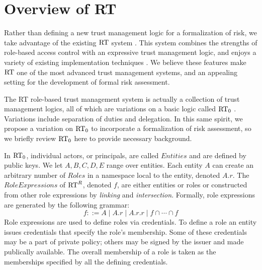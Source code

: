 \section{Overview of RT}
\label{section-rt}

Rather than defining a new trust management logic for a formalization
of risk, we take advantage of the existing $\text{RT}$ system
\cite{Li:2003-04}.  This system combines the strengths of role-based
access control with an expressive trust management logic, and enjoys a
variety of existing implementation techniques \cite{Li:2003-02}.  We
believe these features make $\text{RT}$ one of the most advanced trust
management systems, and an appealing setting for the development of
formal risk assessment.  

The RT role-based trust management system is actually a collection of
trust management logics, all of which are variations on a basic logic
called $\text{RT}_0$ \cite{Li:2003-04}.  Variations include separation of
duties and delegation.  In this same spirit, we propose a variation on
$\text{RT}_0$ to incorporate a formalization of risk assessment, so we
briefly review $\text{RT}_0$ here to provide necessary background.

In $\text{RT}_0$, individual actors, or principals, are called
$\mathit{Entities}$ and are defined by public keys.  We let $A,B,C,D,E$
range over entities.  Each entity $A$ can create an arbitrary number
of $\mathit{Roles}$ in a namespace local to the entity,
denoted $A.r$.  The $\mathit{RoleExpressions}$ of $\text{RT}^R$, denoted $f$, are either
entities or roles or constructed from other role expressions by
\emph{linking} and \emph{intersection}.  Formally, role 
expressions are generated by the following grammar:
$$
f ::= A \mid A.r \mid A.r.r \mid f \cap \cdots \cap f
$$ 
Role expressions are used to define roles via credentials. To define
a role an entity issues credentials that specify the role's
membership. Some of these credentials may be a part of private policy;
others may be signed by the issuer and made publically available. The
overall membership of a role is taken as the memberships specified by
all the defining credentials.

